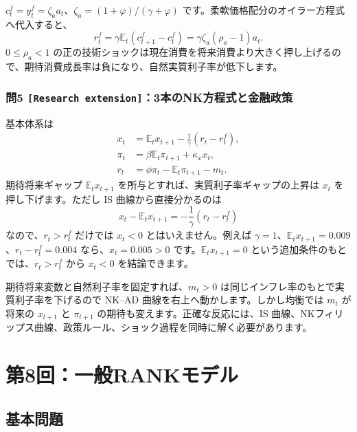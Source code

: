 \documentclass[
  japanese,
  lualatex,
  ja=standard,
  11pt,
  a4paper]{ltjsarticle}
\begin{document}
\(c_t^f=y_t^f=\zeta_a a_t\)、\(\zeta_a=(1+\varphi)/(\gamma+\varphi)\)
です。柔軟価格配分のオイラー方程式へ代入すると、 \[
r_t^f
=\gamma\mathbb E_t(c_{t+1}^f-c_t^f)
=\gamma\zeta_a(\rho_a-1)a_t.
\] \(0\leq\rho_a<1\)
の正の技術ショックは現在消費を将来消費より大きく押し上げるので、期待消費成長率は負になり、自然実質利子率が低下します。

\subsubsection{\texorpdfstring{問5
\texttt{{[}Research\ extension{]}}：3本のNK方程式と金融政策}{問5 {[}Research extension{]}：3本のNK方程式と金融政策}}\label{ux554f5-research-extension3ux672cux306enkux65b9ux7a0bux5f0fux3068ux91d1ux878dux653fux7b56}

基本体系は \[
\begin{aligned}
x_t&=\mathbb E_tx_{t+1}-\frac1\gamma(r_t-r_t^f),\\
\pi_t&=\beta\mathbb E_t\pi_{t+1}+\kappa_xx_t,\\
r_t&=\phi\pi_t-\mathbb E_t\pi_{t+1}-m_t.
\end{aligned}
\] 期待将来ギャップ \(\mathbb E_tx_{t+1}\)
を所与とすれば、実質利子率ギャップの上昇は \(x_t\)
を押し下げます。ただし IS 曲線から直接分かるのは \[
x_t-\mathbb E_tx_{t+1}=-\frac1\gamma(r_t-r_t^f)
\] なので、\(r_t>r_t^f\) だけでは \(x_t<0\) とはいえません。例えば
\(\gamma=1\)、\(\mathbb E_tx_{t+1}=0.009\)、\(r_t-r_t^f=0.004\)
なら、\(x_t=0.005>0\) です。\(\mathbb E_tx_{t+1}=0\)
という追加条件のもとでは、\(r_t>r_t^f\) から \(x_t<0\) を結論できます。

期待将来変数と自然利子率を固定すれば、\(m_t>0\)
は同じインフレ率のもとで実質利子率を下げるので NK--AD
曲線を右上へ動かします。しかし均衡では \(m_t\) が将来の \(x_{t+1}\) と
\(\pi_{t+1}\) の期待も変えます。正確な反応には、IS
曲線、NKフィリップス曲線、政策ルール、ショック過程を同時に解く必要があります。

\clearpage

\section{第8回：一般RANKモデル}\label{ux7b2c8ux56deux4e00ux822crankux30e2ux30c7ux30eb}

\subsection{基本問題}\label{ux57faux672cux554fux984c-7}
\end{document}
